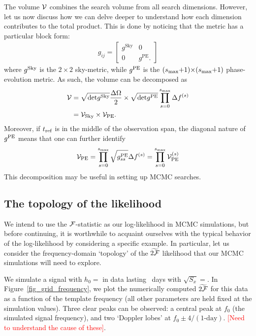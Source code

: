 \documentclass[aps, prd, twocolumn, superscriptaddress, floatfix, showpacs, nofootinbib, longbibliography]{revtex4-1}
\newcommand{\comment}[1]{\textcolor{red}{[#1]}}
\begin{document}
The volume $\mathcal{V}$ combines the search volume from all search dimensions. However,
let us now discuss how we can delve deeper to understand how each dimension
contributes to the total product. This is done by noticing that the metric has
a particular block form:
\begin{align}
g_{ij} = \left[
\begin{array}{cc}
g^{\textrm{Sky}} & 0 \\
0 & g^{\textrm{PE}}.
\end{array}
\right]
\end{align}
where $g^{\rm Sky}$ is the $2\times2$ sky-metric, while $g^{\rm PE}$ is the
$(s_{\textrm{max}}{+}1){\times}(s_{\textrm{max}}{+}1)$ phase-evolution metric.
As such, the volume can be decomposed as
\begin{align}
\mathcal{V} & =
\sqrt{\textrm{det}g^{\rm Sky}}\frac{\Delta\Omega}{2} \times
\sqrt{\textrm{det}g^{\rm PE}}\prod_{s=0}^{s_{\textrm{max}}}\Delta f^{(s)} \\
& = \mathcal{V}_{\rm Sky} \times \mathcal{V}_{\rm PE}.
\label{eqn_metric_volume}
\end{align}
Moreover, if $t_{\rm ref}$ is in the middle of the observation span, the diagonal
nature of $g^{\rm PE}$ means that one can further identify
\begin{align}
\mathcal{V}_{\rm PE} = \prod_{s=0}^{s_{\textrm{max}}}\sqrt{g^{\rm PE}_{ss}} \Delta f^{(s)}
= \prod_{s=0}^{s_{\textrm{max}}}\mathcal{V}_{\rm PE}^{(s)}
\end{align}
This decomposition may be useful in setting up MCMC searches.

\subsection{The topology of the likelihood}
\label{sec_topology}

We intend to use the ${\mathcal{F}}$-statistic as our log-likelihood in MCMC simulations,
but before continuing, it is worthwhile to acquaint ourselves with the typical
behavior of the log-likelihood by considering a specific example.  In
particular, let us consider the frequency-domain `topology' of the $\widetilde{2{\mathcal{F}}}$
likelihood that our MCMC simulations will need to explore.

We simulate a signal with $h_0=$\GridedFrequencyhzero\; in data lasting
\GridedFrequencyT~days with $\sqrt{S_{x}}=$\GridedFrequencySqrtSx.  In
Figure~\ref{fig_grid_frequency}, we plot the numerically computed $\widetilde{2{\mathcal{F}}}$
for this data as a function of the template frequency (all other parameters are
held fixed at the simulation values). Three clear peaks can be observed: a
central peak at $f_0$ (the simulated signal frequency), and two `Doppler lobes'
at $f_0\pm 4/(1\textrm{-day})$. \comment{Need to understand the cause of
these}.
\end{document}
